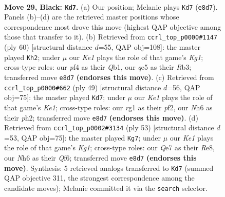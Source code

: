 \documentclass[11pt]{article}
\begin{document}
\clearpage

\begin{figure}[p]\centering
\begin{subfigure}{0.46\textwidth}\centering
\resizebox{\linewidth}{!}{%
\newchessgame
\chessboard[
  setfen={4k1r1/p1p1q1pp/1p2p2n/2p1Q3/5PP1/2P5/1P5P/2K3R1 b - - 0 29},
  showmover=false,
  pgfstyle=straightmove, color=movearrow, markmove={e8-d7}
]}
\caption{}
\end{subfigure}\hfill
\begin{subfigure}{0.46\textwidth}\centering
\resizebox{\linewidth}{!}{%
\newchessgame
\chessboard[
  setfen={1r4k1/3b1p2/3p3p/3P4/1p1qP1pN/1R4P1/5PP1/1Q4K1 w - - 6 31},
  showmover=false,
  pgfstyle=straightmove, color=movearrow, markmove={g1-h2}
]}
\caption{}
\end{subfigure}
\\[4pt]
\begin{subfigure}{0.46\textwidth}\centering
\resizebox{\linewidth}{!}{%
\newchessgame
\chessboard[
  setfen={2q1kr2/1p3p1p/p1p1p3/4Qp2/8/6P1/PPP2P1P/2K1R3 b - - 3 25},
  showmover=false,
  pgfstyle=straightmove, color=movearrow, markmove={e8-d7}
]}
\caption{}
\end{subfigure}\hfill
\begin{subfigure}{0.46\textwidth}\centering
\resizebox{\linewidth}{!}{%
\newchessgame
\chessboard[
  setfen={4r1k1/2p2p2/1p3qp1/p2Pp3/2P1Q3/6P1/PP3PK1/3R4 b - - 3 27},
  showmover=false,
  pgfstyle=straightmove, color=movearrow, markmove={g8-g7}
]}
\caption{}
\end{subfigure}
\caption{\textbf{Move 29, Black: \texttt{Kd7}.} (a) Our position; Melanie plays \texttt{Kd7} (\texttt{e8d7}). Panels (b)--(d) are the retrieved master positions whose correspondence most drove this move (highest QAP objective among those that transfer to it). (b) Retrieved from \texttt{ccrl\_top\_p0000\#1147} (ply 60) [structural distance $d$=55, QAP obj=108]: the master played \texttt{Kh2}; under $\mu$ our \emph{Ke1} plays the role of that game's \emph{Kg1}; cross-type roles: our \emph{p}f4 as their \emph{Q}b1, our \emph{q}e5 as their \emph{R}b3; transferred move \texttt{e8d7} \textbf{(endorses this move)}. (c) Retrieved from \texttt{ccrl\_top\_p0000\#662} (ply 49) [structural distance $d$=56, QAP obj=75]: the master played \texttt{Kd7}; under $\mu$ our \emph{Ke1} plays the role of that game's \emph{Ke1}; cross-type roles: our \emph{r}g1 as their \emph{p}f2, our \emph{N}h6 as their \emph{p}h2; transferred move \texttt{e8d7} \textbf{(endorses this move)}. (d) Retrieved from \texttt{ccrl\_top\_p0002\#3134} (ply 53) [structural distance $d$=53, QAP obj=75]: the master played \texttt{Kg7}; under $\mu$ our \emph{Ke1} plays the role of that game's \emph{Kg1}; cross-type roles: our \emph{Q}e7 as their \emph{R}e8, our \emph{N}h6 as their \emph{Q}f6; transferred move \texttt{e8d7} \textbf{(endorses this move)}. Synthesis: 5 retrieved analogs transferred to \texttt{Kd7} (summed QAP objective 311, the strongest correspondence among the candidate moves); Melanie committed it via the \texttt{search} selector.}
\label{fig:thought-m57}
\end{figure}
\end{document}
